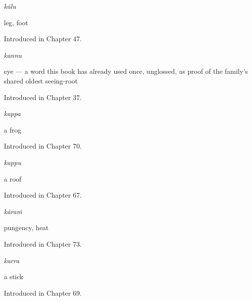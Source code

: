 \noindent\begin{minipage}[t]{\linewidth}
\raggedright
\textbf{}\enspace\emph{kālu}\par
\small leg, foot\par
\footnotesize Introduced in Chapter 47.
\end{minipage}\par\medskip

\noindent\begin{minipage}[t]{\linewidth}
\raggedright
\textbf{}\enspace\emph{kannu}\par
\small eye — a word this book has already used once, unglossed, as proof of the family's shared oldest seeing-root\par
\footnotesize Introduced in Chapter 37.
\end{minipage}\par\medskip

\noindent\begin{minipage}[t]{\linewidth}
\raggedright
\textbf{}\enspace\emph{kappa}\par
\small a frog\par
\footnotesize Introduced in Chapter 70.
\end{minipage}\par\medskip

\noindent\begin{minipage}[t]{\linewidth}
\raggedright
\textbf{}\enspace\emph{kappu}\par
\small a roof\par
\footnotesize Introduced in Chapter 67.
\end{minipage}\par\medskip

\noindent\begin{minipage}[t]{\linewidth}
\raggedright
\textbf{}\enspace\emph{kāraṁ}\par
\small pungency, heat\par
\footnotesize Introduced in Chapter 73.
\end{minipage}\par\medskip

\noindent\begin{minipage}[t]{\linewidth}
\raggedright
\textbf{}\enspace\emph{karra}\par
\small a stick\par
\footnotesize Introduced in Chapter 69.
\end{minipage}\par\medskip

